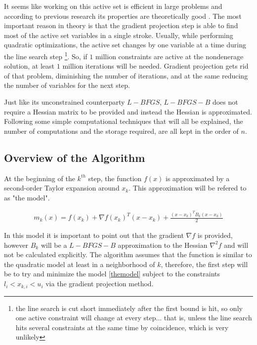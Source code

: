 It seems like working on this active set  is efficient in large problems and according to previous research its properties are theoretically good \citep{nocedal}.  The most important reason in theory is that the gradient projection step is able to find most of the active set variables in a single stroke.  Usually, while performing quadratic optimizations, the active set changes by one variable at a time during the line search step \footnote{the line search is cut short immediately after the first bound is hit, so only one active constraint will change at every step... that is, unless the line search hits several constraints at the same time by coincidence, which is very unlikely}.  So, if $1$ million constraints are active at the nondenerage solution, at least $1$ million iterations will be needed.   Gradient projection gets rid of that problem, diminishing the number of iterations, and at the same reducing the number of variables for the next step.

Just like its unconstrained counterparty $L-BFGS$, $L-BFGS-B$ does not require a Hessian matrix to be provided and instead the Hessian is approximated.  Following some simple computational techniques that will all be explained, the number of computations and the storage required, are all kept in the order of $n$.

\subsection{Overview of the Algorithm}

At the beginning of the $k^{th}$ step, the function $f(x)$ is approximated by a second-order Taylor expansion around $x_k$.  This approximation will be refered to as "the model".

\begin{equation} \label{themodel}
  \begin{aligned}
    m_k(x) = f(x_k) + \nabla f(x_k)^T ( x - x_k) + \frac{(x - x_k)^T B_k (x - x_k) }{2}
  \end{aligned}
\end{equation}

In this model it is important to point out that the gradient $\nabla f$ is provided, however $B_k$ will be a $L-BFGS-B$ approximation to the Hessian $\nabla^2 f$ and will not be calculated explicitly.  The algorithm assumes that the function is similar to the quadratic model at least in a neighborhood of $k$, therefore, the first step will be to try and minimize the model \ref{themodel} subject to the constraints $l_i < x_{k, i} < u_i$ via the gradient projection method.

